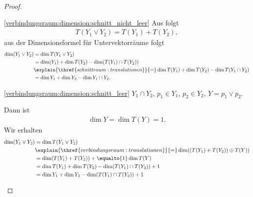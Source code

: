 \begin{proof}
    \begin{proofdescription}
        
        \item[\ref{verbindungsraum:dimension:schnitt_nicht_leer}] Aus  folgt
        \begin{align*}
            T(Y_1\vee Y_2)=T(Y_1)+T(Y_2),
        \end{align*}
        aus der Dimensionsformel für Untervektorräume folgt
        \begin{align*}
            \dim (Y_1\vee Y_2)\begin{aligned}[t] 
                &=\dim T(Y_1\vee Y_2)\\
                &=\dim(Y_1)+\dim T(Y_2)-\dim(T(Y_1)\cap T(Y_2))\\
                &\explain{\thref{schnittraum:translationen}}{=}\dim T(Y_1)+\dim T(Y_2)-\dim T(Y_1\cap Y_2)\\
                &=\dim Y_1+\dim Y_2-\dim Y_1\cap Y_2.
            \end{aligned}
        \end{align*}
        
        \item[\ref{verbindungsraum:dimension:schnitt_leer}] \( Y_1\cap Y_2 \), \( p_1\in Y_1 \), \( p_2\in Y_2 \), \( Y=p_1\vee p_2 \).
        
        Dann ist
        \begin{align*}
            \dim Y=\dim T(Y)=1.
        \end{align*}
        Wir erhalten
        \begin{align*}
            \dim (Y_1\vee Y_2)\begin{aligned}[t] 
                &=\dim T(Y_1\vee Y_2)\\
                &\explain{\thref{verbindungsraum:translationen}}{=}\dim((T(Y_1)+T(Y_2))\oplus T(Y))\\
                &=\dim(T(Y_1)+T(Y_2))+\equalto{1}\dim T(Y)\\
                &=\dim T(Y_1)+\dim T(Y_2)- \dim (T(Y_1)\cap T(Y_2))+1\\
                &=\dim Y_1+\dim Y_2 -\dim(T(Y_1)\cap T(Y_2))+1
            \end{aligned}
        \end{align*}
    \end{proofdescription}
    
\end{proof}
